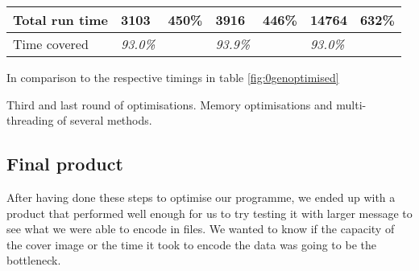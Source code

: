 \begin{threeparttable}[]
{\begin{tabular}{|p{2.8cm}|p{1.9cm}|p{1.4cm}|p{1.9cm}|p{1.4cm}|p{1.8cm}|p{1.5cm}|}
        Total run time  & \textbf{3103} & \textbf{450\%} & \textbf{3916} & \textbf{446\%} & \textbf{14764} & \textbf{632\%} \\ \hline
        Time covered    & \textit{93.0\%} &     & \textit{93.9\%} &     & \textit{93.0\%} &	\\ \hline
    \end{tabular}
    }
    \begin{tablenotes}
        \footnotesize{\item[\textdagger] In comparison to the respective timings in table \ref{fig:0genoptimised}}
    \end{tablenotes}
    \caption{Third and last round of optimisations. Memory optimisations and multi-threading of several methods.}
    \label{fig:3genoptimised}
\end{threeparttable}

\subsection{Final product}
After having done these steps to optimise our programme, we ended up with a product that performed well enough for us to try testing it with larger message to see what we were able to encode in files.
We wanted to know if the capacity of the cover image or the time it took to encode the data was going to be the bottleneck.